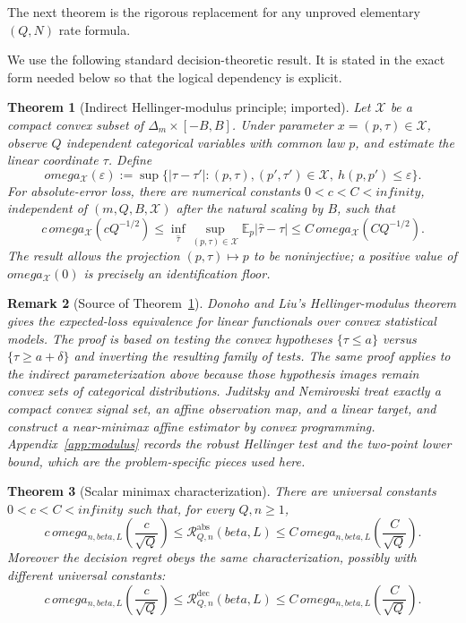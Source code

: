 \documentclass[11pt]{article}
\def\beta{beta}%
\def\omega{omega}%
\def\infty{infinity}%
\newtheorem{theorem}{Theorem}[section]
\newtheorem{remark}[theorem]{Remark}
\newcommand{\E}{\mathbb E}
\newcommand{\calR}{\mathcal R}
\newcommand{\eps}{\varepsilon}
\begin{document}
The next theorem is the rigorous replacement for any unproved elementary $(Q,N)$ rate formula.

We use the following standard decision-theoretic result.  It is stated in the exact form needed below so that the logical dependency is explicit.

\begin{theorem}[Indirect Hellinger-modulus principle; imported]
\label{thm:imported-modulus}
Let $\mathcal X$ be a compact convex subset of $\Delta_m\times[-B,B]$.  Under parameter $x=(p,\tau)\in\mathcal X$, observe $Q$ independent categorical variables with common law $p$, and estimate the linear coordinate $\tau$.  Define
\[
\omega_{\mathcal X}(\eps)
:=
\sup\{|\tau-\tau'|:(p,\tau),(p',\tau')\in\mathcal X,\ h(p,p')\le\eps\}.
\]
For absolute-error loss, there are numerical constants $0<c<C<\infty$, independent of $(m,Q,B,\mathcal X)$ after the natural scaling by $B$, such that
\[
c\,\omega_{\mathcal X}(cQ^{-1/2})
\le
\inf_{\widehat\tau}\sup_{(p,\tau)\in\mathcal X}
\E_p|\widehat\tau-\tau|
\le
C\,\omega_{\mathcal X}(CQ^{-1/2}).
\]
The result allows the projection $(p,\tau)\mapsto p$ to be noninjective; a positive value of $\omega_{\mathcal X}(0)$ is precisely an identification floor.
\end{theorem}

\begin{remark}[Source of Theorem~\ref{thm:imported-modulus}]
Donoho and Liu's Hellinger-modulus theorem gives the expected-loss equivalence for linear functionals over convex statistical models.  The proof is based on testing the convex hypotheses $\{\tau\le a\}$ versus $\{\tau\ge a+\delta\}$ and inverting the resulting family of tests.  The same proof applies to the indirect parameterization above because those hypothesis images remain convex sets of categorical distributions.  Juditsky and Nemirovski treat exactly a compact convex signal set, an affine observation map, and a linear target, and construct a near-minimax affine estimator by convex programming.  Appendix~\ref{app:modulus} records the robust Hellinger test and the two-point lower bound, which are the problem-specific pieces used here.
\end{remark}

\begin{theorem}[Scalar minimax characterization]
\label{thm:modulus-characterization}
There are universal constants $0<c<C<\infty$ such that, for every $Q,n\ge1$,
\begin{equation}
\label{eq:abs-modulus}
c\,\omega_{n,\beta,L}\!\left(\frac{c}{\sqrt Q}\right)
\le
\calR^{\mathrm{abs}}_{Q,n}(\beta,L)
\le
C\,\omega_{n,\beta,L}\!\left(\frac{C}{\sqrt Q}\right).
\end{equation}
Moreover the decision regret obeys the same characterization, possibly with different universal constants:
\begin{equation}
\label{eq:decision-modulus}
c\,\omega_{n,\beta,L}\!\left(\frac{c}{\sqrt Q}\right)
\le
\calR^{\mathrm{dec}}_{Q,n}(\beta,L)
\le
C\,\omega_{n,\beta,L}\!\left(\frac{C}{\sqrt Q}\right).
\end{equation}
\end{theorem}
\end{document}
